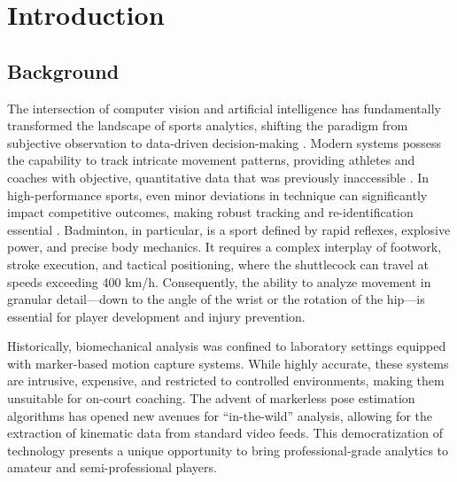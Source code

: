 \documentclass[pdflatex,sn-mathphys-num]{sn-jnl}
\theoremstyle{thmstyleone}%
\theoremstyle{thmstyletwo}%
\theoremstyle{thmstylethree}%
\begin{document}
\section{Introduction}\label{sec1}

\subsection{Background}
The intersection of computer vision and artificial intelligence has fundamentally transformed the landscape of sports analytics, shifting the paradigm from subjective observation to data-driven decision-making \cite{b1}. Modern systems possess the capability to track intricate movement patterns, providing athletes and coaches with objective, quantitative data that was previously inaccessible \cite{b2}. In high-performance sports, even minor deviations in technique can significantly impact competitive outcomes, making robust tracking and re-identification essential \cite{b3}. Badminton, in particular, is a sport defined by rapid reflexes, explosive power, and precise body mechanics. It requires a complex interplay of footwork, stroke execution, and tactical positioning, where the shuttlecock can travel at speeds exceeding 400 km/h. Consequently, the ability to analyze movement in granular detail---down to the angle of the wrist or the rotation of the hip---is essential for player development and injury prevention.

Historically, biomechanical analysis was confined to laboratory settings equipped with marker-based motion capture systems. While highly accurate, these systems are intrusive, expensive, and restricted to controlled environments, making them unsuitable for on-court coaching. The advent of markerless pose estimation algorithms has opened new avenues for ``in-the-wild'' analysis, allowing for the extraction of kinematic data from standard video feeds. This democratization of technology presents a unique opportunity to bring professional-grade analytics to amateur and semi-professional players.
\end{document}
